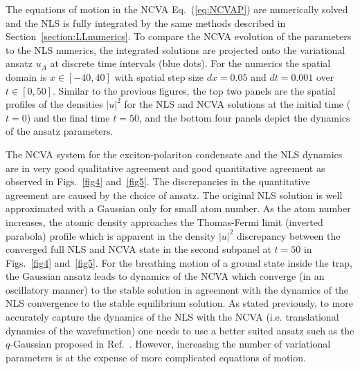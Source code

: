 {The equations of motion in the NCVA Eq.~(\ref{eq:NCVAP}) are numerically solved and the NLS is fully integrated by the same methods described in Section~\ref{section:LLnumerics}.  To compare the NCVA evolution of the parameters to the NLS numerics, the integrated solutions are projected onto the variational ansatz $u_A$ at discrete time intervals (blue dots).  For the numerics the spatial domain is $x\in [-40,40]$ with spatial step size $dx = 0.05$ and $dt=0.001$ over $t\in[0,50]$.  Similar to the previous figures, the top two panels are the spatial profiles of the densities $|u|^2$ for the NLS and NCVA solutions at the initial time ($t=0$) and the final time $t=50$, and the bottom four panels depict the dynamics of the ansatz parameters.   

The NCVA system for the exciton-polariton condensate and the NLS dynamics are in very good qualitative agreement and good quantitative agreement as observed in Figs.~\ref{fig4} and~\ref{fig5}.  The discrepancies in the quantitative agreement are caused by the choice of ansatz.  The original NLS solution is well approximated with a Gaussian only for small atom number.  As the atom number increases, the atomic density approaches the Thomas-Fermi limit (inverted parabola) profile which is apparent in the density $|u|^2$ discrepancy between the converged full NLS and NCVA state in the second subpanel at $t=50$ in Figs.~\ref{fig4} and~\ref{fig5}.  For the breathing motion of a ground state inside the trap, the Gaussian ansatz leads to dynamics of the NCVA which converge (in an oscillatory manner) to the stable solution in agreement with the dynamics of the NLS convergence to the stable equilibrium solution.  As stated previously, to more accurately capture the dynamics of the NLS with the NCVA (i.e. translational dynamics of the wavefunction) one needs to use a better suited ansatz such as the $q$-Gaussian proposed in Ref.~\cite{qGauss}.  However, increasing the number of variational parameters is at the expense of more complicated equations of motion.  



}
